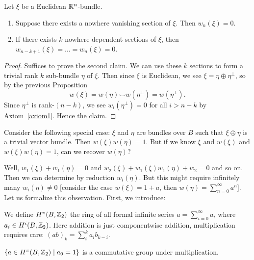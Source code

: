 \begin{proposition}
Let $\xi$ be a Euclidean $\mathbb{R}^{n}$-bundle.
\begin{enumerate}
\item Suppose there exists a nowhere vanishing section of $\xi$. Then $w_{n}(\xi)=0$.
\item If there exists $k$ nowhere dependent sections of $\xi$, then $w_{n-k+1}(\xi)=\dots=w_{n}(\xi)=0$.
\end{enumerate}
\end{proposition}

\begin{proof}
Suffices to prove the second claim. We can use these $k$ sections to
form a trivial rank $k$ sub-bundle $\eta$ of $\xi$. Then since $\xi$
is Euclidean, we see $\xi=\eta\oplus\eta^{\perp}$, so by the previous
Proposition
\begin{equation}
w(\xi)=w(\eta)\smile w(\eta^{\perp})=w(\eta^{\perp}).
\end{equation}
Since $\eta^{\perp}$ is rank-$(n-k)$, we see $w_{i}(\eta^{\perp})=0$
for all $i>n-k$ by Axiom~\ref{axiom1}.  Hence the claim.
\end{proof}

\begin{node}
Consider the following special case: $\xi$ and $\eta$ are bundles over
$B$ such that $\xi\oplus\eta$ is a trivial vector bundle. Then
$w(\xi)w(\eta)=1$. But if we know $\xi$ and $w(\xi)$ and $w(\xi)w(\eta)=1$, can we recover
$w(\eta)$?

Well, $w_{1}(\xi)+w_{1}(\eta)=0$ and
$w_{2}(\xi)+w_{1}(\xi)w_{1}(\eta)+w_{2}=0$ and so on. Then we can
determine by reduction $w_{i}(\eta)$. But this might require
infinitely many $w_{i}(\eta)\neq0$ [consider the case $w(\xi)=1+a$,
  then $w(\eta)=\sum^{\infty}_{n=0}a^{n}$]. Let us formalize this
observation. First, we introduce:
\end{node}

\begin{definition}
We define $H^{\pi}(B,\mathbb{Z}_{2})$ the ring of all formal infinite series
$a=\sum^{\infty}_{i=0}a_{i}$ where $a_{i}\in H^{i}(B,\mathbb{Z}_{2})$. Here
addition is just componentwise addition, multiplication requires care: $(ab)_{k}=\sum^{k}_{i}a_{i}b_{k-i}$.
\end{definition}

\begin{proposition}
$\{a\in H^{\pi}(B,\mathbb{Z}_{2})\mid a_{0}=1\}$ is a commutative group under multiplication.
\end{proposition}
